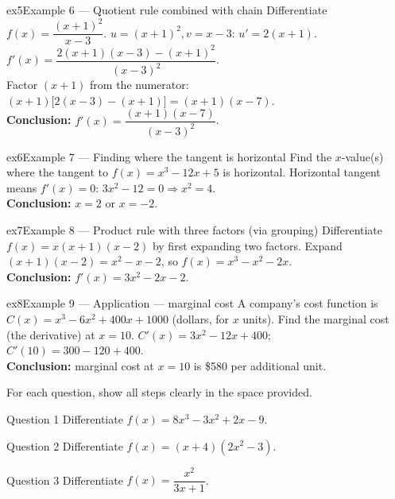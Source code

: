 \documentclass[11pt]{article}
\begin{document}
\begin{example}{ex5}{Example 6 --- Quotient rule combined with chain}
Differentiate $f(x)=\dfrac{(x+1)^2}{x-3}$.\soln
$u=(x+1)^2,v=x-3$: $u'=2(x+1)$. $f'(x)=\dfrac{2(x+1)(x-3)-(x+1)^2}{(x-3)^2}$.\\[3pt]
Factor $(x+1)$ from the numerator: $(x+1)\big[2(x-3)-(x+1)\big]=(x+1)(x-7)$.\\[3pt]\textbf{Conclusion:} $f'(x)=\dfrac{(x+1)(x-7)}{(x-3)^2}$.
\end{example}

\begin{example}{ex6}{Example 7 --- Finding where the tangent is horizontal}
Find the $x$-value(s) where the tangent to $f(x)=x^3-12x+5$ is horizontal.\soln
Horizontal tangent means $f'(x)=0$: $3x^2-12=0\Rightarrow x^2=4$.\\[3pt]\textbf{Conclusion:} $x=2$ or $x=-2$.
\end{example}

\begin{example}{ex7}{Example 8 --- Product rule with three factors (via grouping)}
Differentiate $f(x)=x(x+1)(x-2)$ by first expanding two factors.\soln
Expand $(x+1)(x-2)=x^2-x-2$, so $f(x)=x^3-x^2-2x$.\\[3pt]\textbf{Conclusion:} $f'(x)=3x^2-2x-2$.
\end{example}

\begin{example}{ex8}{Example 9 --- Application --- marginal cost}
A company's cost function is $C(x)=x^3-6x^2+400x+1000$ (dollars, for $x$ units). Find the marginal cost (the derivative) at $x=10$.\soln
$C'(x)=3x^2-12x+400$; $C'(10)=300-120+400$.\\[3pt]\textbf{Conclusion:} marginal cost at $x=10$ is \$580 per additional unit.
\end{example}

\clearpage
{}
For each question, show all steps clearly in the space provided.

\begin{qbox}{Question 1}
Differentiate $f(x)=8x^3-3x^2+2x-9$.\workspace{2.4cm}
\end{qbox}

\begin{qbox}{Question 2}
Differentiate $f(x)=(x+4)(2x^2-3)$.\workspace{2.4cm}
\end{qbox}

\begin{qbox}{Question 3}
Differentiate $f(x)=\dfrac{x^2}{3x+1}$.\workspace{2.4cm}
\end{qbox}
\end{document}
